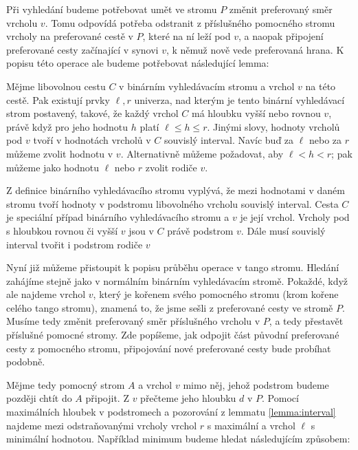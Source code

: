 Při vyhledání budeme potřebovat umět ve stromu $P$ změnit preferovaný směr vrcholu $v$. Tomu odpovídá potřeba odstranit z příslušného pomocného stromu vrcholy na preferované cestě v $P$, které na ní leží pod $v$, a naopak připojení preferované cesty začínající v synovi $v$, k němuž nově vede preferovaná hrana. K popisu této operace ale budeme potřebovat následující lemma:

\begin{lemma}\label{lemma:interval}
Mějme libovolnou cestu $C$ v binárním vyhledávacím stromu a vrchol $v$ na této cestě. Pak existují prvky $\ell, r$  univerza, nad kterým je tento binární vyhledávací strom postavený, takové, že každý vrchol $C$ má hloubku vyšší nebo rovnou $v$, právě když pro jeho hodnotu $h$ platí $\ell \leq h \leq r$. Jinými slovy, hodnoty vrcholů pod $v$ tvoří v hodnotách vrcholů v $C$ souvislý interval. Navíc buď za $\ell$ nebo za $r$ můžeme zvolit hodnotu v $v$. Alternativně můžeme požadovat, aby $\ell < h < r$; pak můžeme jako hodnotu $\ell$ nebo $r$ zvolit rodiče $v$.
\end{lemma}

\begin{dukaz}
Z definice binárního vyhledávacího stromu vyplývá, že mezi hodnotami v daném stromu tvoří hodnoty v podstromu libovolného vrcholu souvislý interval. Cesta $C$ je speciální případ binárního vyhledávacího stromu a $v$ je její vrchol. Vrcholy pod s hloubkou rovnou či vyšší $v$ jsou v $C$ právě podstrom $v$. Dále musí souvislý interval tvořit i podstrom rodiče $v$ 
\end{dukaz}

Nyní již můžeme přistoupit k popisu průběhu operace  v tango stromu.
Hledání zahájíme stejně jako v normálním binárním vyhledávacím stromě. Pokaždé,
když ale najdeme vrchol $v$, který je kořenem svého pomocného stromu (krom
kořene celého tango stromu), znamená to, že jsme sešli z preferované cesty ve
stromě $P$. Musíme tedy změnit preferovaný směr příslušného vrcholu v $P$, a
tedy přestavět příslušné pomocné stromy. Zde popíšeme, jak odpojit část původní
preferované cesty z pomocného stromu, připojování nové preferované cesty bude
probíhat podobně.

Mějme tedy pomocný strom $A$ a vrchol $v$ mimo něj, jehož podstrom budeme později chtít do $A$ připojit. Z $v$ přečteme jeho hloubku $d$ v $P$. Pomocí maximálních hloubek v podstromech a pozorování z lemmatu \ref{lemma:interval} najdeme mezi odstraňovanými vrcholy vrchol $r$ s maximální a vrchol $\ell$ s minimální hodnotou. Například minimum budeme hledat následujícím způsobem:

